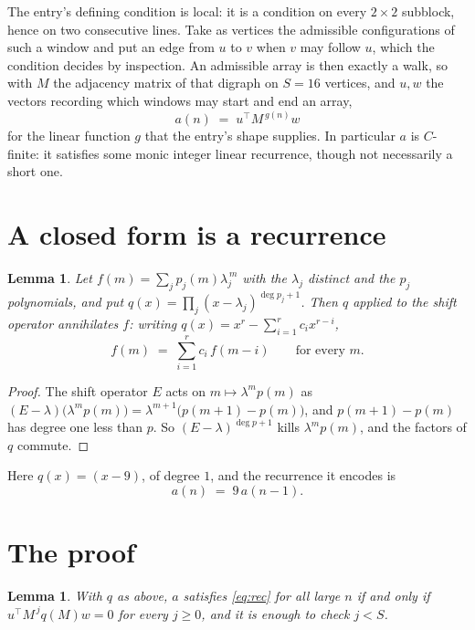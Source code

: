 \documentclass[11pt,a4paper]{article}
\theoremstyle{plain}
\newtheorem{lemma}[theorem]{Lemma}
\theoremstyle{definition}
\begin{document}
The entry's defining condition is local: it is a condition on every $2\times2$ subblock, hence on two consecutive lines. Take as vertices the
admissible configurations of such a window and put an edge from $u$ to $v$ when $v$ may
follow $u$, which the condition decides by inspection. An admissible array is then exactly a
walk, so with $M$ the adjacency matrix of that digraph on $S=16$ vertices, and $u,w$ the
vectors recording which windows may start and end an array,
\[
a(n)\;=\;u^{\!\top}M^{\,g(n)}w
\]
for the linear function $g$ that the entry's shape supplies. In particular $a$ is
$C$-finite: it satisfies some monic integer linear recurrence, though not necessarily a short
one.

\section{A closed form is a recurrence}

\begin{lemma}\label{lem:ann}
Let $f(m)=\sum_{j}p_j(m)\lambda_j^{\,m}$ with the $\lambda_j$ distinct and the $p_j$
polynomials, and put $q(x)=\prod_j(x-\lambda_j)^{\deg p_j+1}$. Then $q$ applied to the shift
operator annihilates $f$: writing $q(x)=x^{r}-\sum_{i=1}^{r}c_ix^{r-i}$,
\[
f(m)\;=\;\sum_{i=1}^{r}c_i\,f(m-i)\qquad\text{for every }m.
\]
\end{lemma}

\begin{proof}
The shift operator $E$ acts on $m\mapsto\lambda^{m}p(m)$ as
$(E-\lambda)\bigl(\lambda^{m}p(m)\bigr)=\lambda^{m+1}\bigl(p(m+1)-p(m)\bigr)$, and
$p(m+1)-p(m)$ has degree one less than $p$. So $(E-\lambda)^{\deg p+1}$ kills
$\lambda^{m}p(m)$, and the factors of $q$ commute.
\end{proof}

Here $q(x)=(x-9)$, of degree $1$, and the recurrence it encodes is
\begin{equation}\label{eq:rec}
a(n)\;=\;9\,a(n-1).
\end{equation}

\section{The proof}

\begin{lemma}\label{lem:crit}
With $q$ as above, $a$ satisfies \eqref{eq:rec} for all large $n$ if and only if
$u^{\!\top}M^{\,j}q(M)w=0$ for every $j\ge0$, and it is enough to check $j<S$.
\end{lemma}
\end{document}
